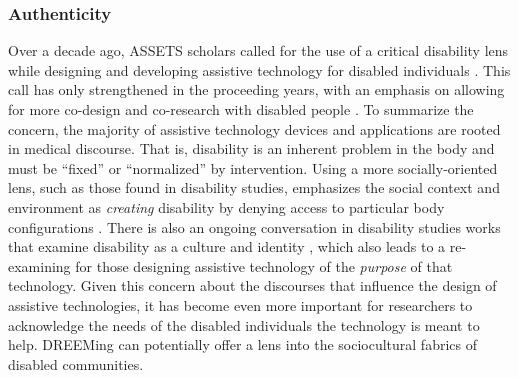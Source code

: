 \subsubsection{Authenticity} \label{authenticity}
Over a decade ago, ASSETS scholars called for the use of a critical disability lens while designing and developing assistive technology for disabled individuals \cite{mankoffDisabilityStudiesSource2010}. This call has only strengthened in the proceeding years, with an emphasis on allowing for more co-design and co-research with disabled people \cite{bennettPromiseEmpathyDesign2019,ymousAmJustTerrified2020,spielAgencyAutisticChildren2019}. To summarize the concern, the majority of assistive technology devices and applications are rooted in medical discourse. That is, disability is an inherent problem in the body and must be ``fixed'' or ``normalized'' by intervention. Using a more socially-oriented lens, such as those found in disability studies, emphasizes the social context and environment as \textit{creating} disability by denying access to particular body configurations \cite{ginsburgDisabilityWorlds2013,ringlandPlacePlayDis2019,titchkoskyQuestionAccessDisability2011}. There is also an ongoing conversation in disability studies works that examine disability as a culture and identity \cite{kaferFeministQueerCrip2013}, which also leads to a re-examining for those designing assistive technology of the \textit{purpose} of that technology. Given this concern about the discourses that influence the design of assistive technologies, it has become even more important for researchers to acknowledge the needs of the disabled individuals the technology is meant to help. DREEMing can potentially offer a lens into the sociocultural fabrics of disabled communities.

